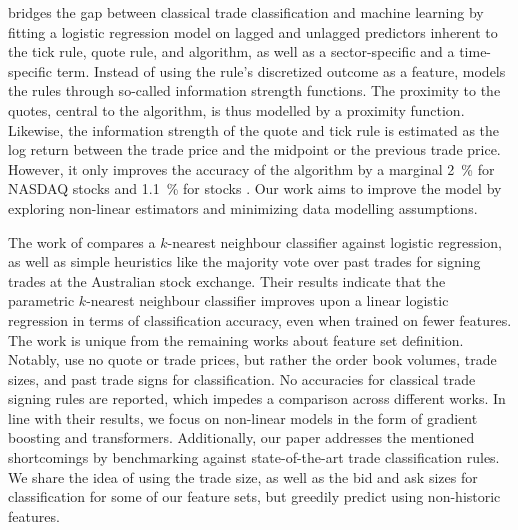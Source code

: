 \textcite[5]{rosenthalModelingTradeDirection2012} bridges the gap between classical trade classification and machine learning by fitting a logistic regression model on lagged and unlagged predictors inherent to the tick rule, quote rule, and  algorithm, as well as a sector-specific and a time-specific term. Instead of using the rule's discretized outcome as a feature, \textcite[481--482]{rosenthalModelingTradeDirection2012} models the rules through so-called information strength functions. The proximity to the quotes, central to the  algorithm, is thus modelled by a proximity function. Likewise, the information strength of the quote and tick rule is estimated as the log return between the trade price and the midpoint or the previous trade price. However, it only improves the accuracy of the  algorithm by a marginal \SI{2}{\percent} for \gls{NASDAQ} stocks and \SI{1.1}{\percent} for  stocks \textcite[15]{rosenthalModelingTradeDirection2012}. Our work aims to improve the model by exploring non-linear estimators and minimizing data modelling assumptions.

The work of \textcite[483]{blazejewskiLocalNonParametricModel2005} compares a $k$-nearest neighbour classifier against logistic regression, as well as simple heuristics like the majority vote over past trades for signing trades at the Australian stock exchange. Their results indicate that the parametric $k$-nearest neighbour classifier improves upon a linear logistic regression in terms of classification accuracy, even when trained on fewer features. The work is unique from the remaining works about feature set definition. Notably, \textcite[3]{blazejewskiLocalNonParametricModel2005} use no quote or trade prices, but rather the order book volumes, trade sizes, and past trade signs for classification. No accuracies for classical trade signing rules are reported, which impedes a comparison across different works. In line with their results, we focus on non-linear models in the form of gradient boosting and transformers. Additionally, our paper addresses the mentioned shortcomings by benchmarking against state-of-the-art trade classification rules. We share the idea of using the trade size, as well as the bid and ask sizes for classification for some of our feature sets, but greedily predict using non-historic features.

